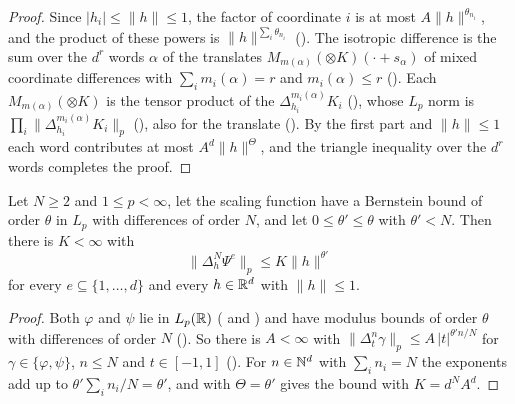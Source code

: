 \begin{proof}
\leanok
{}
Since $|h_i| \leq \|h\| \leq 1$, the factor of coordinate $i$ is at most
$A \|h\|^{\theta_{n_i}}$, and the product of these powers is $\|h\|^{\sum_i \theta_{n_i}}$
(). The isotropic difference is the sum over the $d^r$ words $\alpha$ of
the translates $M_{m(\alpha)} (\otimes K)(\cdot + s_\alpha)$ of mixed coordinate differences with
$\sum_i m_i(\alpha) = r$ and $m_i(\alpha) \leq r$ (). Each
$M_{m(\alpha)} (\otimes K)$ is the tensor product of the $\Delta^{m_i(\alpha)}_{h_i} K_i$
(), whose $L_p$ norm is
$\prod_i \|\Delta^{m_i(\alpha)}_{h_i} K_i\|_p$ (), also for the
translate (). By the first part and $\|h\| \leq 1$ each word contributes
at most $A^d \|h\|^\Theta$, and the triangle inequality over the $d^r$ words completes the proof.
\end{proof}

\begin{theorem}
\label{thm:daub-rd-generator-moduli}
\leanok
{}
Let $N \geq 2$ and $1 \leq p < \infty$, let the scaling function have a Bernstein bound of order
$\theta$ in $L_p$ with differences of order $N$, and let $0 \leq \theta' \leq \theta$ with
$\theta' < N$. Then there is $K < \infty$ with
\[
  \|\Delta_h^N \Psi^e\|_p \leq K \|h\|^{\theta'}
\]
for every $e \subseteq \{1, \dots, d\}$ and every $h \in \mathbb{R}^d$ with $\|h\| \leq 1$.
\end{theorem}

\begin{proof}
\leanok
{}
Both $\varphi$ and $\psi$ lie in $L_p(\mathbb{R})$ ( and
) and have modulus bounds of order $\theta$ with differences of
order $N$ (). So there is $A < \infty$ with
$\|\Delta_t^n \gamma\|_p \leq A \, |t|^{\theta' n / N}$ for $\gamma \in \{\varphi, \psi\}$,
$n \leq N$ and $t \in [-1, 1]$ (). For $n \in \mathbb{N}^d$ with
$\sum_i n_i = N$ the exponents add up to $\theta' \sum_i n_i / N = \theta'$, and
 with $\Theta = \theta'$ gives the bound with
$K = d^N A^d$.
\end{proof}


